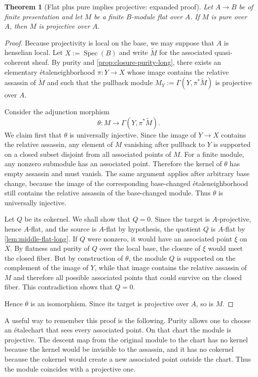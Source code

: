 \documentclass[11pt,oneside]{article}
\newtheorem{theorem}{Theorem}[section]
\newcommand{\Spec}{\operatorname{Spec}}
\newcommand{\etale}{\'etale}
\begin{document}
\begin{theorem}[Flat plus pure implies projective: expanded proof]\label{thm:flat-pure-projective-long}
Let $A\to B$ be of finite presentation and let $M$ be a finite $B$-module flat over $A$.  If $M$ is pure over $A$, then $M$ is projective over $A$.
\end{theorem}

\begin{proof}
Because projectivity is local on the base, we may suppose that $A$ is henselian local.  Let $X:=\Spec(B)$ and write $\widetilde M$ for the associated quasi-coherent sheaf.  By purity and \cref{prop:closure-purity-long}, there exists an elementary \etale neighborhood $\pi\colon Y\to X$ whose image contains the relative assassin of $\widetilde M$ and such that the pullback module $M_Y:=\Gamma(Y,\pi^*\widetilde M)$ is projective over $A$.

Consider the adjunction morphism
\[
\theta\colon M\longrightarrow \Gamma(Y,\pi^*\widetilde M).
\]
We claim first that $\theta$ is universally injective.  Since the image of $Y\to X$ contains the relative assassin, any element of $M$ vanishing after pullback to $Y$ is supported on a closed subset disjoint from all associated points of $M$.  For a finite module, any nonzero submodule has an associated point.  Therefore the kernel of $\theta$ has empty assassin and must vanish.  The same argument applies after arbitrary base change, because the image of the corresponding base-changed \etale neighborhood still contains the relative assassin of the base-changed module.  Thus $\theta$ is universally injective.

Let $Q$ be its cokernel.  We shall show that $Q=0$.  Since the target is $A$-projective, hence $A$-flat, and the source is $A$-flat by hypothesis, the quotient $Q$ is $A$-flat by \cref{lem:middle-flat-long}.  If $Q$ were nonzero, it would have an associated point $\xi$ on $X$.  By flatness and purity of $Q$ over the local base, the closure of $\xi$ would meet the closed fiber.  But by construction of $\theta$, the module $Q$ is supported on the complement of the image of $Y$, while that image contains the relative assassin of $M$ and therefore all possible associated points that could survive on the closed fiber.  This contradiction shows that $Q=0$.

Hence $\theta$ is an isomorphism.  Since its target is projective over $A$, so is $M$.
\end{proof}

A useful way to remember this proof is the following.  Purity allows one to choose an \etale chart that sees every associated point.  On that chart the module is projective.  The descent map from the original module to the chart has no kernel because the kernel would be invisible to the assassin, and it has no cokernel because the cokernel would create a new associated point outside the chart.  Thus the module coincides with a projective one.
\end{document}
